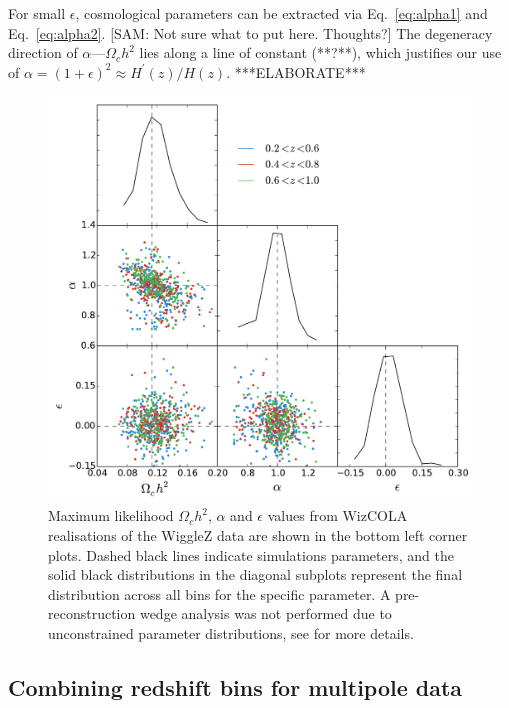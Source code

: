 \documentclass[iop,twocolappendix]{emulateapj}
\newcommand{\blue}{\color{blue}}
\newcommand{\red}{\color{red}}
\begin{document}
For small $\epsilon$, cosmological parameters can be extracted via Eq.~\ref{eq:alpha1} and Eq.~\ref{eq:alpha2}.  {\red [SAM: Not sure what to put here.  Thoughts?] The degeneracy direction of $\alpha$---$\Omega_c h^2$ lies along a line of constant (**?**), which justifies our use of $\alpha=(1+\epsilon)^2\approx H^\prime(z)/H(z)$. ***ELABORATE*** }


\begin{figure}[h!]
	\begin{center}
		\includegraphics[width=\columnwidth]{images/mpDist2.pdf}
	\end{center}
	\caption{Maximum likelihood $\Omega_c h^2$, $\alpha$ and $\epsilon$ values from WizCOLA realisations of the WiggleZ data are shown in the bottom left corner plots. Dashed black lines indicate simulations parameters, and the solid black distributions in the diagonal subplots represent the final distribution across all bins for the specific parameter. {\blue A pre-reconstruction wedge analysis was not performed due to unconstrained parameter distributions, see \citet[\S 4.3]{HintonThesis2015} for more details.}}
	\label{fig:mpDist2}
\end{figure}



\subsection{Combining redshift bins for multipole data}
\end{document}
